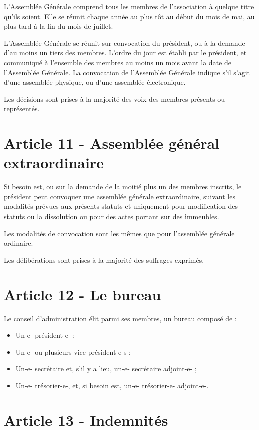 \documentclass[a4paper,oneside,10pt]{article}
\begin{document}
L'Assemblée Générale comprend tous les membres de l'association à quelque titre qu'ils soient. Elle se réunit chaque année au plus tôt au début du mois de mai, au plus tard à la fin du mois de juillet.


L'Assemblée Générale se réunit sur convocation du président, ou à la demande d'au moins un tiers des membres. L'ordre du jour est établi par le président, et communiqué à l'ensemble des membres au moins un mois avant la date de l'Assemblée Générale. La convocation de l'Assemblée Générale indique s'il s'agit d'une assemblée physique, ou d'une assemblée électronique.


Les décisions sont prises à la majorité des voix des membres présents ou représentés.


\section*{Article 11 - Assemblée général extraordinaire}

Si besoin est, ou sur la demande de la moitié plus un des membres inscrits, le président peut convoquer une assemblée générale extraordinaire, suivant les modalités prévues aux présents statuts et uniquement pour modification des statuts ou la dissolution ou pour des actes portant sur des immeubles.


Les modalités de convocation sont les mêmes que pour l'assemblée générale ordinaire.


Les délibérations sont prises à la majorité des suffrages exprimés.


\section*{Article 12 - Le bureau}

Le conseil d'administration élit parmi ses membres, un bureau composé de :

\begin{itemize}
\item Un-e- président-e- ;
\item Un-e- ou plusieurs vice-président-e-s ;
\item Un-e- secrétaire et, s'il y a lieu, un-e- secrétaire adjoint-e- ;
\item Un-e- trésorier-e-, et, si besoin est, un-e- trésorier-e- adjoint-e-.
\end{itemize}

\section*{Article 13 - Indemnités}
\end{document}
